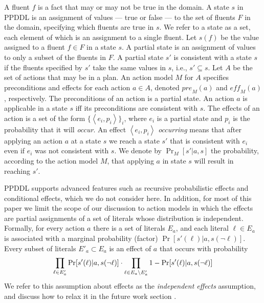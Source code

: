 \documentclass[letterpaper]{article} %
\newcommand{\eff}{\textit{eff}}
\newcommand{\pre}{\textit{pre}}
\newcommand{\tuple}[1]{\ensuremath{\left \langle #1 \right \rangle }}
\begin{document}
A fluent $f$ is a fact that may or may not be true in the domain. 
A state $s$ in PPDDL is an assignment of values --- true or false --- to the set of fluents $F$ in the domain, specifying which fluents are true in $s$. 
We refer to a state as a set, each element of which is an assignment to a single fluent.
Let $s(f)$ be the value assigned to a fluent $f\in F$ in a state $s$. 
A partial state is an assignment of values to only a subset of the fluents in $F$. 
A partial state $s'$ is consistent with a state $s$ 
if the fluents specified by $s'$ take the same values in $s$, i.e., $s'\subseteq s$. 
Let $A$ be the set of actions that may be in a plan. 
An action model $M$ for $A$ specifies preconditions and effects for each action $a\in A$, 
denoted $\pre_M(a)$ and $\eff_M(a)$, respectively. 
The preconditions of an action is a partial state. 
An action $a$ is applicable in a state $s$ iff its preconditions are consistent with $s$. 
The effects of an action is a set of the form $\{ \tuple{e_i, p_i} \}_i$, 
where $e_i$ is a partial state and $p_i$ is the probability that it will \emph{occur}. 
An effect $\tuple{e_i, p_i}$ \emph{occurring} means that after applying an action $a$ at a state $s$ we reach a state $s'$ that is consistent with $e_i$ even if $e_i$ was not consistent with $s$. We denote by $\Pr_M[s'|a,s]$ the probability, according to the action model $M$, 
that applying $a$ in state $s$ will result in reaching $s'$. 

PPDDL supports advanced features such as recursive probabilistic effects and conditional effects, which we do not consider here. In addition, for most of this paper we limit the scope of our discussion to action models in which the effects are partial assignments of a set of literals whose distribution is independent. 
Formally, for every action $a$ there is a set of literals $E_a$, 
and each literal $\ell\in E_a$ is associated with a marginal probability (factor) $\Pr[s'(\ell)|a,s(\neg \ell)]$. Every subset of literals $E'_a\subset E_a$ is an effect of $a$ that occurs with probability 
\begin{equation}
\small
    \prod_{\ell\in E'_a} \Pr[s'(\ell)|a,s(\neg \ell)]\cdot
    \prod_{\ell\in E_a\setminus E'_a} 1-\Pr[s'(\ell)|a,s(\neg \ell)]   
    \label{eq:assumption}
\end{equation}
We refer to this assumption about effects as the \emph{independent effects} assumption, and discuss how to relax it in the future work section . 
\end{document}
